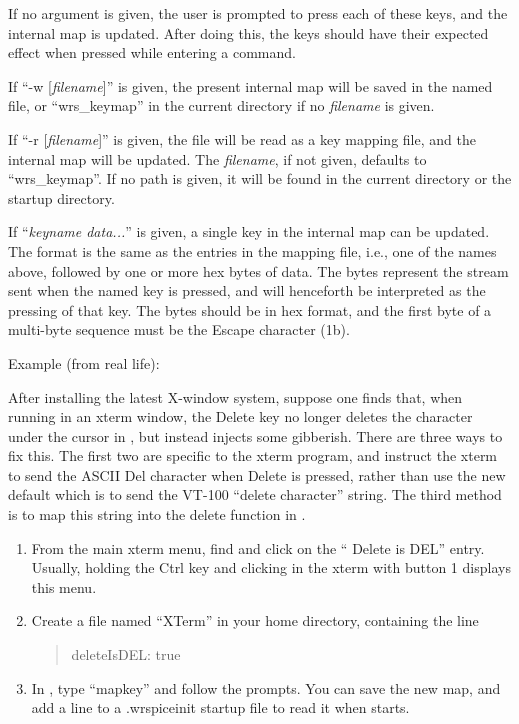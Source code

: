 If no argument is given, the user is prompted to press each of these
keys, and the internal map is updated.  After doing this, the keys
should have their expected effect when pressed while entering a
{\WRspice} command.

If ``{\vt -w} [{\it filename\/}]'' is given, the present internal
map will be saved in the named file, or ``{\vt wrs\_keymap}'' in the
current directory if no {\it filename} is given.

If ``{\vt -r} [{\it filename\/}]'' is given, the file will be read
as a key mapping file, and the internal map will be updated.  The
{\it filename}, if not given, defaults to ``{\vt wrs\_keymap}''.  If
no path is given, it will be found in the current directory or the
startup directory.

If ``{\it keyname data...}'' is given, a single key in the internal
map can be updated.  The format is the same as the entries in the
mapping file, i.e., one of the names above, followed by one or more
hex bytes of data.  The bytes represent the stream sent when the named
key is pressed, and will henceforth be interpreted as the pressing of
that key.  The bytes should be in hex format, and the first byte of a
multi-byte sequence must be the {\kb Escape} character (1b).

Example (from real life):

After installing the latest X-window system, suppose one finds that,
when running {\WRspice} in an {\vt xterm} window, the {\kb Delete} key
no longer deletes the character under the cursor in {\WRspice}, but
instead injects some gibberish.  There are three ways to fix this. 
The first two are specific to the {\vt xterm} program, and instruct
the {\vt xterm} to send the ASCII Del character when {\kb Delete} is
pressed, rather than use the new default which is to send the VT-100
``delete character'' string.  The third method is to map this string
into the delete function in {\WRspice}.

\begin{enumerate}
\item{From the main {\vt xterm} menu, find and click on the ``{\cb
Delete is DEL}'' entry.  Usually, holding the {\kb Ctrl} key and
clicking in the {\vt xterm} with button 1 displays this menu.}

\item{Create a file named ``{\vt XTerm}'' in your home directory,
containing the line
\begin{quote}
{\vt *deleteIsDEL: true}
\end{quote}}

\item{In {\WRspice}, type ``{\vt mapkey}'' and follow the prompts. 
You can save the new map, and add a line to a {\vt .wrspiceinit}
startup file to read it when {\WRspice} starts.}
\end{enumerate}

